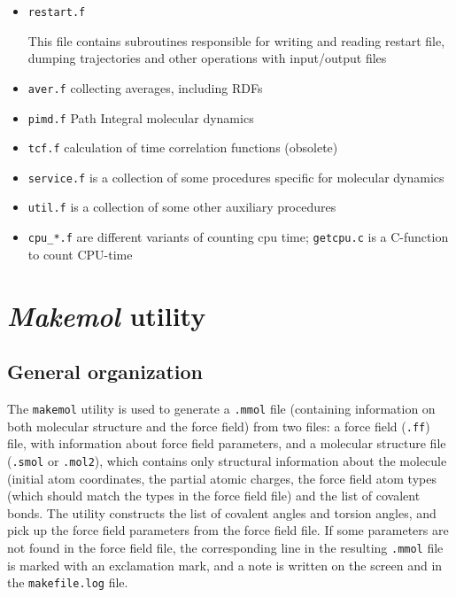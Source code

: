\documentclass{article}
\begin{document}
\begin{itemize}
\item
\verb|restart.f|  

This file contains subroutines responsible for writing and
reading restart file, dumping trajectories and other operations
with input/output files

\item
\verb|aver.f| collecting averages, including RDFs

\item
\verb|pimd.f| Path Integral molecular dynamics

\item
\verb|tcf.f| calculation of time correlation functions (obsolete)

\item
\verb|service.f| is a collection of some procedures specific for 
molecular dynamics

\item
\verb|util.f| is a collection of some other auxiliary procedures


\item
\verb|cpu_*.f|  are different variants of counting cpu time;
\verb|getcpu.c| is a C-function to count CPU-time

		      
\end{itemize}

\section{{\em Makemol} utility}

\subsection{General organization}

The \verb|makemol| utility is used to generate a \verb|.mmol| file 
(containing information on both molecular structure and the force field)
from two files: a force field (\verb|.ff|) file, with information about 
force field parameters, and a molecular structure file (\verb|.smol| or 
\verb|.mol2|), which 
contains only structural information about the molecule (initial atom 
coordinates, the partial atomic charges, the force field atom types 
(which should match the types in the force field file) and 
the list of covalent bonds. 
The utility constructs the list of covalent angles and torsion angles,
and pick up the force field parameters from the force field file. If some
parameters are not found in the force field file, the corresponding line
in the resulting \verb|.mmol| file is marked with an exclamation mark, 
and a note is written on the screen and in the \verb|makefile.log| file.
\end{document}
